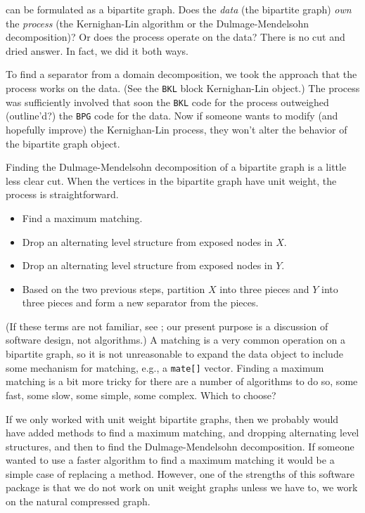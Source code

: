 can be formulated as a bipartite graph.
Does the {\it data} (the bipartite graph) {\it own} the {\it
process} (the Kernighan-Lin algorithm or the Dulmage-Mendelsohn
decomposition)?
Or does the process operate on the data?
There is no cut and dried answer.
In fact, we did it both ways.
\par
To find a separator from a domain decomposition, we took the
approach that the process works on the data.
(See the {\tt BKL} block Kernighan-Lin object.)
The process was sufficiently involved that soon the {\tt BKL} code
for the process outweighed (outline'd?) the {\tt BPG} code for the data.
Now if someone wants to modify (and hopefully improve) the
Kernighan-Lin process, they won't alter the behavior of the
bipartite graph object.
\par
Finding the Dulmage-Mendelsohn decomposition of a bipartite graph
is a little less clear cut.
When the vertices in the bipartite graph have unit weight, the
process is straightforward.
\begin{itemize}
\item
Find a maximum matching.
\item
Drop an alternating level structure from exposed nodes in $X$.
\item
Drop an alternating level structure from exposed nodes in $Y$.
\item
Based on the two previous steps, partition $X$ into three pieces
and $Y$ into three pieces and form a new separator from the
pieces.
\end{itemize}
(If these terms are not familiar, see \cite{ash98-maxflow};
our present purpose is a discussion of software design, not
algorithms.)
A matching is a very common operation on a bipartite graph,
so it is not unreasonable to expand the data object to include some
mechanism for matching, e.g., a {\tt mate[]} vector.
Finding a maximum matching is a bit more tricky for there are a
number of algorithms to do so, some fast, some slow,
some simple, some complex. Which to choose?
\par
If we only worked with unit weight bipartite graphs, then we
probably would have added methods to find a maximum matching,
and dropping alternating level structures, and then to find the
Dulmage-Mendelsohn decomposition.
If someone wanted to use a faster algorithm to find a maximum
matching it would be a simple case of replacing a method.
However, one of the strengths of this software package is that we
do not work on unit weight graphs unless we have to, we work on the
natural compressed graph.
\par
